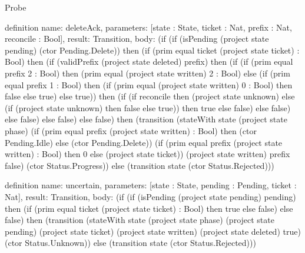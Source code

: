 \begin{lexlean}{Probe}
\begin{semanticmodule}
definition{
  name: deleteAck,
  parameters: [state : State, ticket : Nat, prefix : Nat, reconcile : Bool],
  result: Transition,
  body: (if (if (isPending (project state pending) (ctor Pending.Delete)) then (if (prim equal ticket (project state ticket) : Bool) then (if (validPrefix (project state deleted) prefix) then (if (if (prim equal prefix 2 : Bool) then (prim equal (project state written) 2 : Bool) else (if (prim equal prefix 1 : Bool) then (if (prim equal (project state written) 0 : Bool) then false else true) else true)) then (if (if reconcile then (project state unknown) else (if (project state unknown) then false else true)) then true else false) else false) else false) else false) else false) then (transition (stateWith state (project state phase) (if (prim equal prefix (project state written) : Bool) then (ctor Pending.Idle) else (ctor Pending.Delete)) (if (prim equal prefix (project state written) : Bool) then 0 else (project state ticket)) (project state written) prefix false) (ctor Status.Progress)) else (transition state (ctor Status.Rejected)))
}

definition{
  name: uncertain,
  parameters: [state : State, pending : Pending, ticket : Nat],
  result: Transition,
  body: (if (if (isPending (project state pending) pending) then (if (prim equal ticket (project state ticket) : Bool) then true else false) else false) then (transition (stateWith state (project state phase) (project state pending) (project state ticket) (project state written) (project state deleted) true) (ctor Status.Unknown)) else (transition state (ctor Status.Rejected)))
}


\end{semanticmodule}
\end{lexlean}
